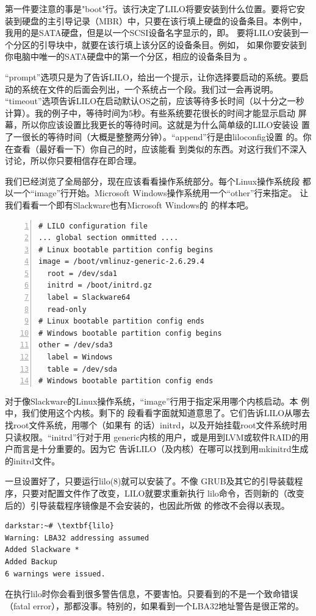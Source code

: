第一件要注意的事是"boot"行。该行决定了LILO将要安装到什么位置。要将它安
装到硬盘的主引导记录（MBR）中，只要在该行填上硬盘的设备条目。本例中，
我用的是SATA硬盘，但是以一个SCSI设备名字显示的，即。
要将LILO安装到一个分区的引导块中，就要在该行填上该分区的设备条目。例如，
如果你要安装到你电脑中唯一的SATA硬盘中的第一个分区，相应的设备条目为
。

``prompt''选项只是为了告诉LILO，给出一个提示，让你选择要启动的系统。要启
动的系统在文件的后面会列出，一个系统占一个段。我们过一会再说明。
``timeout''选项告诉LILO在启动默认OS之前，应该等待多长时间（以十分之一秒
计算）。我的例子中，等待时间为5秒。有些系统要花很长的时间才能显示启动
屏幕，所以你应该设置比我更长的等待时间。这就是为什么简单级的LILO安装设
置了一很长的等待时间（大概是整整两分钟）。``append''行是由liloconfig设置
的。你在查看（最好看一下）你自己的时，应该能看
到类似的东西。对这行我们不深入讨论，所以你只要相信存在即合理。

我们已经浏览了全局部分，现在应该看看操作系统部分。每个Linux操作系统段
都以一个``image''行开始。Microsoft Windows操作系统用一个``other''行来指定。
让我们看看一个即有Slackware也有Microsoft Windows的
的样本吧。

\begin{Verbatim}[frame=single, commandchars=\\\{\}, numbers=left, numberblanklines=fasle]
# LILO configuration file
... global section ommitted ....
# Linux bootable partition config begins
image = /boot/vmlinuz-generic-2.6.29.4
  root = /dev/sda1
  initrd = /boot/initrd.gz
  label = Slackware64
  read-only
# Linux bootable partition config ends
# Windows bootable partition config begins
other = /dev/sda3
  label = Windows
  table = /dev/sda
# Windows bootable partition config ends
\end{Verbatim}
对于像Slackware的Linux操作系统，``image''行用于指定采用哪个内核启动。本
例中，我们使用这个内核。剩下的
段看看字面就知道意思了。它们告诉LILO从哪去找root文件系统，用哪个（如果有
的话）initrd，以及开始挂载root文件系统时用只读权限。``initrd''行对于用
generic内核的用户，或是用到LVM或软件RAID的用户而言是十分重要的。因为它
告诉LILO（及内核）在哪可以找到用mkinitrd生成的initrd文件。

一旦设置好了，只要运行lilo(8)就可以安装了。不像
GRUB及其它的引导装载程序，只要对配置文件作了改变，LILO就要求重新执行
lilo命令，否则新的（改变后的）引导装载程序镜像是不会安装的，也因此所做
的修改不会得以表现。


\begin{Verbatim}[frame=single, commandchars=\\\{\}]
darkstar:~# \textbf{lilo}
Warning: LBA32 addressing assumed
Added Slackware *
Added Backup
6 warnings were issued.
\end{Verbatim}

在执行lilo时你会看到很多警告信息，不要害怕。只要看到的不是一个致命错误
（fatal error），那都没事。特别的，如果看到一个LBA32地址警告是很正常的。


